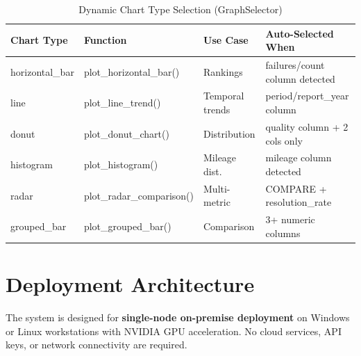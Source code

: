\documentclass[12pt, a4paper, twoside]{article}
\begin{document}
\begin{table}[H]
\centering
\caption{Dynamic Chart Type Selection (GraphSelector)}
\label{tab:charts}
\begin{tabularx}{\textwidth}{L{2.2cm} L{2.8cm} L{2.5cm} X}
\toprule
{}\color{white}\textbf{Chart Type} & \color{white}\textbf{Function} & \color{white}\textbf{Use Case} & \color{white}\textbf{Auto-Selected When} \\
\midrule
horizontal\_bar & plot\_horizontal\_bar() & Rankings & failures/count column detected \\
line & plot\_line\_trend() & Temporal trends & period/report\_year column \\
donut & plot\_donut\_chart() & Distribution & quality column + 2 cols only \\
histogram & plot\_histogram() & Mileage dist. & mileage column detected \\
radar & plot\_radar\_comparison() & Multi-metric & COMPARE + resolution\_rate \\
grouped\_bar & plot\_grouped\_bar() & Comparison & 3+ numeric columns \\
\bottomrule
\end{tabularx}
\end{table}

\newpage

\section{Deployment Architecture}

The system is designed for \textbf{single-node on-premise deployment} on Windows or Linux workstations with NVIDIA GPU acceleration. No cloud services, API keys, or network connectivity are required.
\end{document}
